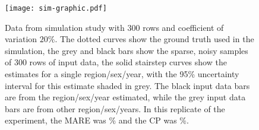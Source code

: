 \begin{figure}
\texttt{[image: sim-graphic.pdf]}
\caption{Data from simulation study with $300$ rows and coefficient of
  variation $20\%$.  The dotted curves show the ground truth used in
  the simulation, the grey and black bars show the sparse, noisy
  samples of $300$ rows of input data, the solid stairstep curves show
  the estimates for a single region/sex/year, with the 95\%
  uncertainty interval for this estimate shaded in grey.  The black
  input data bars are from the region/sex/year estimated, while the
  grey input data bars are from other region/sex/years.  In this
  replicate of the experiment, the MARE was \% and the
  CP was \%.}
\label{fig:sim-graphic}
\end{figure}
